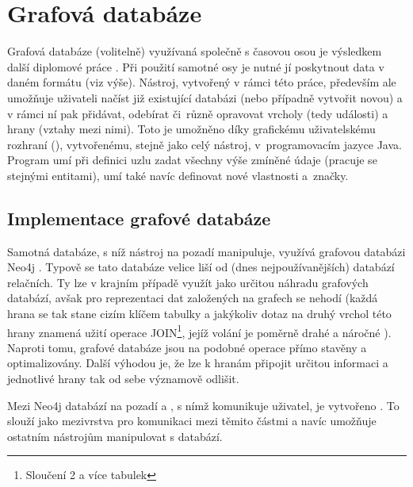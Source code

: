 \section{Grafová databáze}
Grafová databáze (volitelně) využívaná společně s časovou osou je výsledkem další diplomové práce \cite{timeline2}. Při použití samotné osy je nutné jí poskytnout data v daném formátu (viz výše). Nástroj, vytvořený v rámci této práce, především ale umožňuje uživateli načíst již existující databázi (nebo případně vytvořit novou) a v rámci ní pak přidávat, odebírat či~různě opravovat vrcholy (tedy události) a hrany (vztahy mezi nimi). Toto je umožněno díky grafickému uživatelskému rozhraní (), vytvořenému, stejně jako celý nástroj, v~programovacím jazyce Java. Program umí při definici uzlu zadat všechny výše zmíněné údaje (pracuje se stejnými entitami), umí také navíc definovat nové vlastnosti a~značky.
\subsection{Implementace grafové databáze}
Samotná databáze, s níž nástroj na pozadí manipuluje, využívá grafovou databázi Neo4j \cite{neo4j}. Typově se tato databáze velice liší od (dnes nejpoužívanějších) databází relačních. Ty lze v krajním případě využít jako určitou náhradu grafových databází, avšak pro reprezentaci dat založených na grafech se nehodí (každá hrana se tak stane cizím klíčem tabulky a jakýkoliv dotaz na druhý vrchol této hrany znamená užití operace JOIN\footnote{Sloučení 2 a více tabulek}, jejíž volání je poměrně drahé a náročné \cite{graphdb}). Naproti tomu, grafové databáze jsou na podobné operace přímo stavěny a optimalizovány. Další výhodou je, že lze k hranám připojit určitou informaci a jednotlivé hrany tak od sebe významově odlišit.

Mezi Neo4j databází na pozadí a , s nímž komunikuje uživatel, je vytvořeno . To slouží jako mezivrstva pro komunikaci mezi těmito částmi a navíc umožňuje ostatním nástrojům manipulovat s databází.
 
 
 
 
